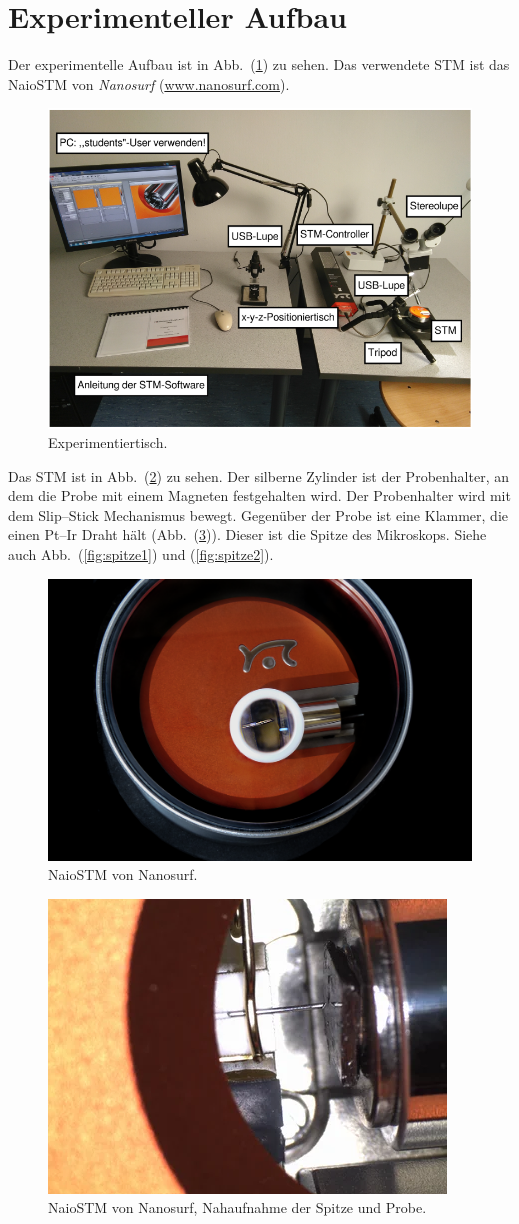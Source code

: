 \documentclass[sn-mathphys-num,iicol]{sn-jnl}
\theoremstyle{thmstyleone}
\theoremstyle{thmstyletwo}
\theoremstyle{thmstylethree}
\begin{document}
\section{Experimenteller Aufbau}
Der experimentelle Aufbau ist in Abb.\ (\ref{fig:aufbau}) zu sehen.
Das verwendete STM ist das \glqq NaioSTM\grqq{} von \textit{Nanosurf} (\url{www.nanosurf.com}).
\begin{figure}[t]
  \centering
  \includegraphics[width=.5\textwidth]{422_aufbau.png}
  \caption{Experimentiertisch.\cite{anleitung422}} \label{fig:aufbau}
\end{figure}
Das STM ist in Abb.\ (\ref{fig:naiostm}) zu sehen.
Der silberne Zylinder ist der Probenhalter, an dem die Probe mit einem Magneten festgehalten wird.
Der Probenhalter wird mit dem Slip--Stick Mechanismus bewegt.
Gegenüber der Probe ist eine Klammer, die einen Pt--Ir Draht hält (Abb.\ (\ref{fig:naiostm_closeup})).
Dieser ist die Spitze des Mikroskops.
Siehe auch Abb.\ (\ref{fig:spitze1}) und (\ref{fig:spitze2}).
\begin{figure}[t]
  \centering
  \includegraphics[width=.5\textwidth]{422_naiostm.png}
  \caption{NaioSTM von Nanosurf.\cite{nanosurf}} \label{fig:naiostm}
\end{figure}
\begin{figure}[t]
  \centering
  \includegraphics[width=.5\textwidth]{422_naiostm_closeup.png}
  \caption{NaioSTM von Nanosurf, Nahaufnahme der Spitze und Probe.\cite{nanosurf}} \label{fig:naiostm_closeup}
\end{figure}
\end{document}

